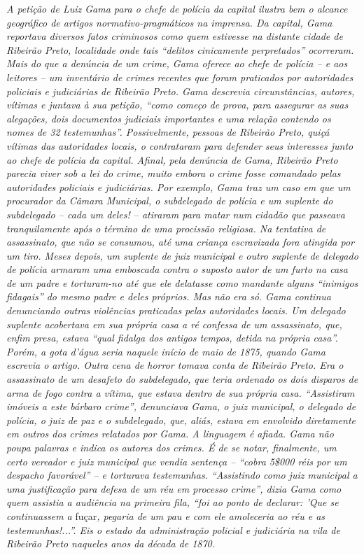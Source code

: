 \begin{didascalia}
\emph{A petição de Luiz Gama para o chefe de polícia da capital ilustra
bem o alcance geográfico de artigos normativo-pragmáticos na imprensa.
Da capital, Gama reportava diversos fatos criminosos como quem estivesse
na distante cidade de Ribeirão Preto, localidade onde tais ``delitos
cinicamente perpretados'' ocorreram. Mais do que a denúncia de um crime,
Gama oferece ao chefe de polícia -- e aos leitores -- um inventário de
crimes recentes que foram praticados por autoridades policiais e
judiciárias de Ribeirão Preto. Gama descrevia circunstâncias, autores,
vítimas e juntava à sua petição, ``como começo de prova, para assegurar
as suas alegações, dois documentos judiciais importantes e uma relação
contendo os nomes de 32 testemunhas''. Possivelmente, pessoas de Ribeirão
Preto, quiçá vítimas das autoridades locais, o contrataram para defender
seus interesses junto ao chefe de polícia da capital. Afinal, pela
denúncia de Gama, Ribeirão Preto parecia viver sob a lei do crime, muito
embora o crime fosse comandado pelas autoridades policiais e
judiciárias. Por exemplo, Gama traz um caso em que um procurador da
Câmara Municipal, o subdelegado de polícia e um suplente do subdelegado
-- cada um deles! -- atiraram para matar num cidadão que passeava
tranquilamente após o término de uma procissão religiosa. Na tentativa
de assassinato, que não se consumou, até uma criança escravizada fora
atingida por um tiro. Meses depois, um suplente de juiz municipal e
outro suplente de delegado de polícia armaram uma emboscada contra o
suposto autor de um furto na casa de um padre e torturam-no até que ele
delatasse como mandante alguns ``inimigos fidagais'' do mesmo padre e
deles próprios. Mas não era só. Gama continua denunciando outras
violências praticadas pelas autoridades locais. Um delegado suplente
acobertava em sua própria casa a ré confessa de um assassinato, que,
enfim presa, estava ``qual fidalga dos antigos tempos, detida na própria
casa''. Porém, a gota d'água seria naquele início de maio de 1875, quando
Gama escrevia o artigo. Outra cena de horror tomava conta de Ribeirão
Preto. Era o assassinato de um desafeto do subdelegado, que teria
ordenado os dois disparos de arma de fogo contra a vítima, que estava
dentro de sua própria casa. ``Assistiram imóveis a este bárbaro crime'',
denunciava Gama, o juiz municipal, o delegado de polícia, o juiz de paz
e o subdelegado, que, aliás, estava em envolvido diretamente em outros
dos crimes relatados por Gama. A linguagem é afiada. Gama não poupa
palavras e indica os autores dos crimes. É de se notar, finalmente, um
certo vereador e juiz municipal que vendia sentença -- ``cobra 5\$000
réis por um despacho favorável'' -- e torturava testemunhas. ``Assistindo
como juiz municipal a uma justificação para defesa de um réu em processo
crime'', dizia Gama como quem assistia a audiência na primeira fila, ``foi
ao ponto de declarar: 'Que se continuassem a} fuçar\emph{, pegaria de um
pau e com ele amoleceria ao réu e as testemunhas!...''. Eis o estado da
administração policial e judiciária na vila de Ribeirão Preto naqueles
anos da década de 1870.}
\end{didascalia}

